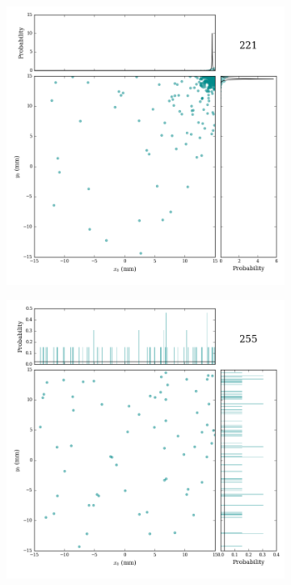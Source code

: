 \documentclass[12pt]{article}
\begin{document}
\begin{figure}
\medskip
\centering
\begin{subfigure}{.5\textwidth}
  \centering
  \includegraphics[width=\linewidth]{../figures/cellfigs/cell221.png}
  \label{fig:sub1}
\end{subfigure}%
\begin{subfigure}{.5\textwidth}
  \centering
  \includegraphics[width=\linewidth]{../figures/cellfigs/cell255.png}

\end{subfigure}
\end{figure}
\end{document}

